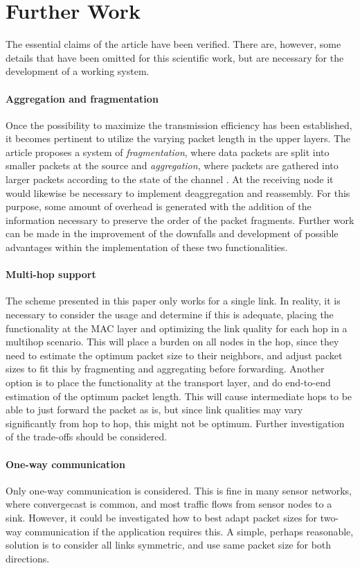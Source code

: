 \section{Further Work\label{sec:FW}}
The essential claims of the article \cite{DPLCpaper} have been verified. There are, however, some details that have been omitted for this scientific work, but are necessary for the development of a working system.
\paragraph{Aggregation and fragmentation} Once the possibility to maximize the transmission efficiency has been established, it becomes pertinent to utilize the varying packet length in the upper layers. The article proposes a system of \emph{fragmentation}, where data packets are split into smaller packets at the source and \emph{aggregation}, where packets are gathered into larger packets according to the state of the channel \cite{DPLCpaper}. At the receiving node it would likewise be necessary to implement deaggregation and reassembly. For this purpose, some amount of overhead is generated with the addition of the information necessary to preserve the order of the packet fragments. Further work can be made in the improvement of the downfalls and development of possible advantages within the implementation of these two functionalities.
\paragraph{Multi-hop support} The scheme presented in this paper only works for a single link. In reality, it is necessary to consider the usage and determine if this is adequate, placing the functionality at the MAC layer and optimizing the link quality for each hop in a multihop scenario. This will place a burden on all nodes in the hop, since they need to estimate the optimum packet size to their neighbors, and adjust packet sizes to fit this by fragmenting and aggregating before forwarding. Another option is to place the functionality at the transport layer, and do end-to-end estimation of the optimum packet length. This will cause intermediate hops to be able to just forward the packet as is, but since link qualities may vary significantly from hop to hop, this might not be optimum. Further investigation of the trade-offs should be considered.
\paragraph{One-way communication} Only one-way communication is considered. This is fine in many sensor networks, where convergecast is common, and most traffic flows from sensor nodes to a sink. However, it could be investigated how to best adapt packet sizes for two-way communication if the application requires this. A simple, perhaps reasonable, solution is to consider all links symmetric, and use same packet size for both directions.

